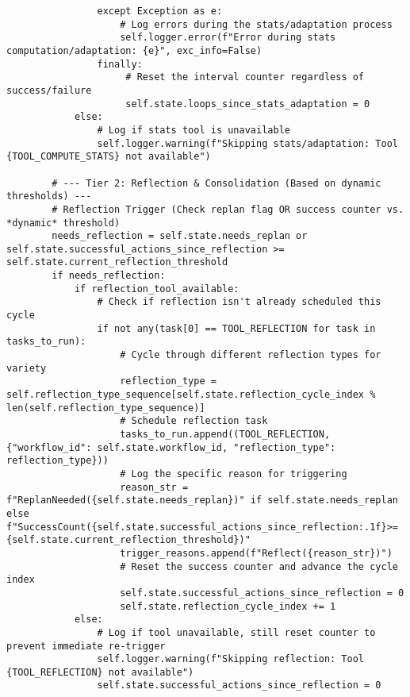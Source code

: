 \documentclass[12pt,a4paper]{article}
\begin{document}
\begin{pageablecode}
\begin{verbatim}
                except Exception as e:
                    # Log errors during the stats/adaptation process
                    self.logger.error(f"Error during stats computation/adaptation: {e}", exc_info=False)
                finally:
                     # Reset the interval counter regardless of success/failure
                     self.state.loops_since_stats_adaptation = 0
            else:
                # Log if stats tool is unavailable
                self.logger.warning(f"Skipping stats/adaptation: Tool {TOOL_COMPUTE_STATS} not available")

        # --- Tier 2: Reflection & Consolidation (Based on dynamic thresholds) ---
        # Reflection Trigger (Check replan flag OR success counter vs. *dynamic* threshold)
        needs_reflection = self.state.needs_replan or self.state.successful_actions_since_reflection >= self.state.current_reflection_threshold
        if needs_reflection:
            if reflection_tool_available:
                # Check if reflection isn't already scheduled this cycle
                if not any(task[0] == TOOL_REFLECTION for task in tasks_to_run):
                    # Cycle through different reflection types for variety
                    reflection_type = self.reflection_type_sequence[self.state.reflection_cycle_index % len(self.reflection_type_sequence)]
                    # Schedule reflection task
                    tasks_to_run.append((TOOL_REFLECTION, {"workflow_id": self.state.workflow_id, "reflection_type": reflection_type}))
                    # Log the specific reason for triggering
                    reason_str = f"ReplanNeeded({self.state.needs_replan})" if self.state.needs_replan else f"SuccessCount({self.state.successful_actions_since_reflection:.1f}>={self.state.current_reflection_threshold})"
                    trigger_reasons.append(f"Reflect({reason_str})")
                    # Reset the success counter and advance the cycle index
                    self.state.successful_actions_since_reflection = 0
                    self.state.reflection_cycle_index += 1
            else:
                # Log if tool unavailable, still reset counter to prevent immediate re-trigger
                self.logger.warning(f"Skipping reflection: Tool {TOOL_REFLECTION} not available")
                self.state.successful_actions_since_reflection = 0


\end{verbatim}
\end{pageablecode}
\end{document}
